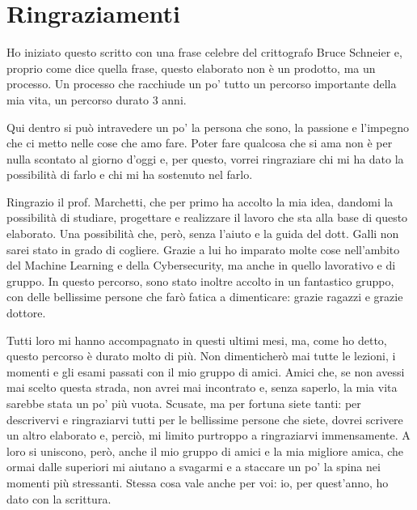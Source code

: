 \chapter*{Ringraziamenti}

Ho iniziato questo scritto con una frase celebre del crittografo Bruce Schneier e, proprio come dice quella frase, questo elaborato non è un prodotto, ma un processo.
Un processo che racchiude un po' tutto un percorso importante della mia vita, un percorso durato 3 anni.

Qui dentro si può intravedere un po' la persona che sono, la passione e l'impegno che ci metto nelle cose che amo fare.
Poter fare qualcosa che si ama non è per nulla scontato al giorno d'oggi e, per questo, vorrei ringraziare chi mi ha dato la possibilità di farlo e chi mi ha sostenuto nel farlo.

Ringrazio il prof. Marchetti, che per primo ha accolto la mia idea, dandomi la possibilità di studiare, progettare e realizzare il lavoro che sta alla base di questo elaborato.
Una possibilità che, però, senza l'aiuto e la guida del dott. Galli non sarei stato in grado di cogliere.
Grazie a lui ho imparato molte cose nell'ambito del Machine Learning e della Cybersecurity, ma anche in quello lavorativo e di gruppo. 
In questo percorso, sono stato inoltre accolto in un fantastico gruppo, con delle bellissime persone che farò fatica a dimenticare: grazie ragazzi e grazie dottore.

Tutti loro mi hanno accompagnato in questi ultimi mesi, ma, come ho detto, questo percorso è durato molto di più.
Non dimenticherò mai tutte le lezioni, i momenti e gli esami passati con il mio gruppo di amici.
Amici che, se non avessi mai scelto questa strada, non avrei mai incontrato e, senza saperlo, la mia vita sarebbe stata un po' più vuota.
Scusate, ma per fortuna siete tanti: per descrivervi e ringraziarvi tutti per le bellissime persone che siete, dovrei scrivere un altro elaborato e, perciò, mi limito purtroppo a ringraziarvi immensamente.
A loro si uniscono, però, anche il mio gruppo di amici e la mia migliore amica, che ormai dalle superiori mi aiutano a svagarmi e a staccare un po' la spina nei momenti più stressanti.
Stessa cosa vale anche per voi: io, per quest'anno, ho dato con la scrittura.

